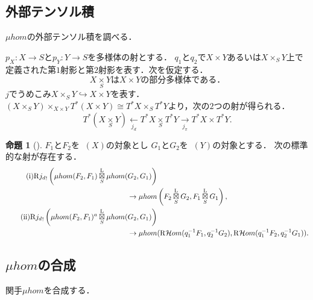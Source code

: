 \documentclass[leqno, 10pt, a4paper, dvipdfmx]{jsarticle}
\theoremstyle{definition}
\numberwithin{equation}{section}
\newcommand{\Dompb}{\mathop{\mathsf{D}^\mathrm{b}}\nolimits}
\newcommand{\HOM}{\mathop{\mathcal{H}\hspace{-0pt}om}\nolimits}%
\newcommand{\RHOM}{\mathop{\mathrm{R}\hspace{-1.5pt}\HOM}\nolimits}
\newcommand{\Rder}{\mathrm{R}}
\newcommand{\lletens}[1][]{\mathbin{{\mathop{\boxtimes}\limits^{\mathrm{L}}_{#1}}}}
\newcommand{\dpb}[1][]{\mathbin{\mathop{\times}\limits_{#1}}}
\newcommand{\tpb}[1][]{\mathbin{\mathop{\times}\nolimits_{#1}}}
\theoremstyle{mystyle}
\newtheorem{PRP}[AXM]{命題}
\renewenvironment{leftbar}{%
  \def\FrameCommand{\textcolor{lightgray}{\vrule width 4pt} \hspace{10pt}}%
  \MakeFramed {\advance\hsize-\width \FrameRestore}}%
{\endMakeFramed}
\newcommand{\mpb}[1][]{{#1}_{\pi}} %
\newcommand{\mdiff}[1][]{{#1}_{d}} %
\newcommand{\cotb}[1][]{T^{\ast}{#1}}
\newcommand{\muhom}{\mu hom}
\begin{document}
\subsection*{外部テンソル積}

\(\muhom\)の外部テンソル積を調べる．

\(p_X\colon X\to S\)と\(p_Y\colon Y\to S\)を多様体の射とする．
\(q_1\)と\(q_2\)で\(X\times Y\)あるいは\(X\tpb[S]Y\)上で
定義された第\(1\)射影と第\(2\)射影を表す．次を仮定する．
\begin{equation}
    \text{\(X\dpb[S]Y\)は\(X\times Y\)の部分多様体である．}
\end{equation}
\(j\)でうめこみ\(X\tpb[S]Y\hookrightarrow X\times Y\)を表す．
\((X\tpb[S]Y)\tpb[X\times Y]\cotb[(X\times Y)]\cong\cotb[X]\tpb[S]\cotb[Y]\)より，次の\(2\)つの射が得られる．
\begin{equation}
    \cotb[{\left(X\dpb[S]Y\right)}]
    \underset{{\mdiff[j]}}{\longleftarrow}
    \cotb[X]\dpb[S]\cotb[Y]
    \underset{{\mpb[j]}}{\longrightarrow}
    \cotb[X]\times\cotb[Y].
\end{equation}

\begin{leftbar}
\begin{PRP}[{\cite[Prop.4.4.8]{KS90}}]
  \(F_1\)と\(F_2\)を\(\Dompb(X)\)の対象とし
  \(G_1\)と\(G_2\)を\(\Dompb(Y)\)の対象とする．
  次の標準的な射が存在する．
  \begin{align}
    \tag{i}
    \Rder{{\mdiff[j]}_{!}}\left(
      \muhom(F_2,F_1)\lletens[S]\muhom(G_2,G_1)
    \right)&\\
    \to
    \muhom&\left(
      F_2\lletens[S]G_2,F_1\lletens[S]G_1
    \right),\notag\\
    \tag{ii}
    \Rder{{\mdiff[j]}_{!}}\left(
      \muhom(F_2,F_1)^{a}\lletens[S]\muhom(G_2,G_1)
    \right)&\\
    \to
    \muhom&(
      \RHOM(q_{1}^{-1}F_1,q_{2}^{-1}G_2),
      \RHOM(q_{1}^{-1}F_2,q_{2}^{-1}G_1)
    )\notag.
  \end{align}
\end{PRP}
\end{leftbar}

\subsection*{\(\muhom\)の合成}
関手\(\muhom\)を合成する．
\end{document}
